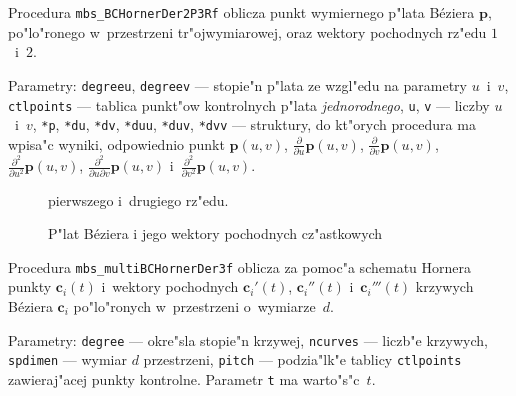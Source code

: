 \vspace{\bigskipamount}
Procedura \texttt{mbs\_BCHornerDer2P3Rf} oblicza punkt wymiernego p"lata
B\'{e}ziera $\bm{p}$, po"lo"ronego w~przestrzeni tr"ojwymiarowej,
oraz wektory pochodnych rz"edu $1$~i~$2$.

Parametry: \texttt{degreeu}, \texttt{degreev} --- stopie"n p"lata ze
wzgl"edu na parametry $u$~i~$v$, \texttt{ctlpoints} --- tablica punkt"ow
kontrolnych p"lata \emph{jednorodnego}, \texttt{u}, \texttt{v} --- liczby
$u$~i~$v$, \texttt{*p}, \texttt{*du}, \texttt{*dv}, \texttt{*duu}, \texttt{*duv},
\texttt{*dvv} --- struktury, do kt"orych procedura ma wpisa"c wyniki,
odpowiednio punkt $\bm{p}(u,v)$, $\frac{\partial}{\partial u}\bm{p}(u,v)$,
$\frac{\partial}{\partial v}\bm{p}(u,v)$,
$\frac{\partial^2}{\partial u^2}\bm{p}(u,v)$,
$\frac{\partial^2}{\partial u\partial v}\bm{p}(u,v)$
i~$\frac{\partial^2}{\partial v^2}\bm{p}(u,v)$.%
\begin{figure}[ht]
  \centerline{}
  \caption{P"lat B\'{e}ziera i jego wektory pochodnych cz"astkowych}
  \centerline{pierwszego i~drugiego rz"edu.}
\end{figure}

\vspace{\bigskipamount}
\begin{sloppypar}
Procedura \texttt{mbs\_multiBCHornerDer3f} oblicza za pomoc"a schematu
Hornera punk\-ty $\bm{c}_i(t)$ i~wektory pochodnych $\bm{c}_i'(t)$,
$\bm{c}_i''(t)$ i~$\bm{c}_i'''(t)$ krzywych
B\'{e}ziera $\bm{c}_i$ po"lo"ronych w~przestrzeni o~wymiarze~$d$.
\end{sloppypar}

Parametry: \texttt{degree} --- okre"sla stopie"n krzywej, \texttt{ncurves}
--- liczb"e krzywych, \texttt{spdimen} --- wymiar $d$ przestrzeni,
\texttt{pitch} --- podzia"lk"e tablicy \texttt{ctlpoints} zawieraj"acej
punkty kontrolne. Parametr \texttt{t} ma warto"s"c~$t$.

